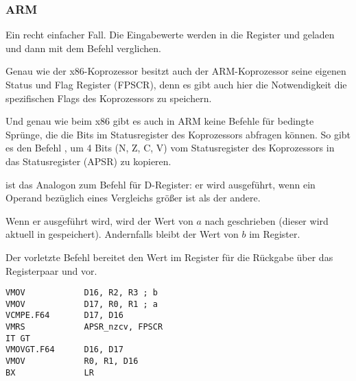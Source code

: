\subsubsection{ARM}

\myparagraph{\OptimizingXcodeIV (\ARMMode)}



Ein recht einfacher Fall.
Die Eingabewerte werden in die Register  und  geladen und dann mit dem Befehl  verglichen. 

Genau wie der x86-Koprozessor besitzt auch der ARM-Koprozessor seine eigenen Status und Flag Register (\ac{FPSCR}), denn
es gibt auch hier die Notwendigkeit die spezifischen Flags des Koprozessors zu speichern.

Und genau wie beim x86 gibt es auch in ARM keine Befehle für bedingte Sprünge, die die Bits im Statusregister des
Koprozessors abfragen können. So gibt es den Befehl , um 4 Bits (N, Z, C, V) vom Statusregister des
Koprozessors in das  Statusregister (\ac{APSR}) zu kopieren.

 ist das Analogon zum  Befehl für D-Register: er wird ausgeführt, wenn ein Operand bezüglich
eines  Vergleichs größer ist als der andere.

Wenn er ausgeführt wird, wird der Wert von $a$ nach  geschrieben (dieser wird aktuell in 
gespeichert). Andernfalls bleibt der Wert von $b$ im  Register.

Der vorletzte Befehl  bereitet den Wert im  Register für die Rückgabe über das Registerpaar 
und  vor.

\myparagraph{\OptimizingXcodeIV (\ThumbTwoMode)}

\begin{lstlisting}[caption=\OptimizingXcodeIV (\ThumbTwoMode),style=customasmARM]
VMOV            D16, R2, R3 ; b
VMOV            D17, R0, R1 ; a
VCMPE.F64       D17, D16
VMRS            APSR_nzcv, FPSCR
IT GT 
VMOVGT.F64      D16, D17
VMOV            R0, R1, D16
BX              LR
\end{lstlisting}

